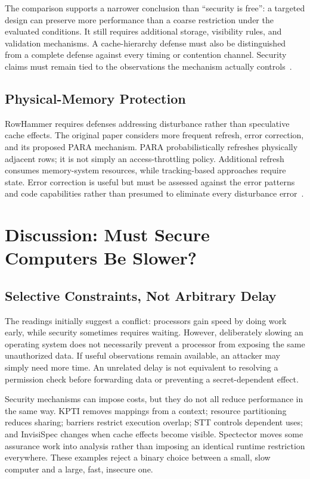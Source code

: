 \documentclass[man,12pt,apacite,nofontenc,nolmodern,floatsintext]{apa6}
\begin{document}
The comparison supports a narrower conclusion than ``security is free'': a targeted design can preserve more performance than a coarse restriction under the evaluated conditions. It still requires additional storage, visibility rules, and validation mechanisms. A cache-hierarchy defense must also be distinguished from a complete defense against every timing or contention channel. Security claims must remain tied to the observations the mechanism actually controls~\cite{contracts2021,spectre2019,invisispec2018}.

\subsection{Physical-Memory Protection}
RowHammer requires defenses addressing disturbance rather than speculative cache effects. The original paper considers more frequent refresh, error correction, and its proposed PARA mechanism. PARA probabilistically refreshes physically adjacent rows; it is not simply an access-throttling policy. Additional refresh consumes memory-system resources, while tracking-based approaches require state. Error correction is useful but must be assessed against the error patterns and code capabilities rather than presumed to eliminate every disturbance error~\cite{kim2014}.

\section{Discussion: Must Secure Computers Be Slower?}
\subsection{Selective Constraints, Not Arbitrary Delay}
The readings initially suggest a conflict: processors gain speed by doing work early, while security sometimes requires waiting. However, deliberately slowing an operating system does not necessarily prevent a processor from exposing the same unauthorized data. If useful observations remain available, an attacker may simply need more time. An unrelated delay is not equivalent to resolving a permission check before forwarding data or preventing a secret-dependent effect.

Security mechanisms can impose costs, but they do not all reduce performance in the same way. KPTI removes mappings from a context; resource partitioning reduces sharing; barriers restrict execution overlap; STT controls dependent uses; and InvisiSpec changes when cache effects become visible. Spectector moves some assurance work into analysis rather than imposing an identical runtime restriction everywhere. These examples reject a binary choice between a small, slow computer and a large, fast, insecure one.
\end{document}
